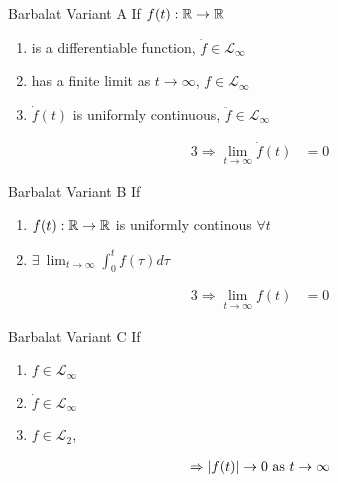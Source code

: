 \begin{lemma}{Barbalat Variant A}
    If $f(t): \mathbb{R} \rightarrow \mathbb{R}$
    \begin{enumerate}
    \item is a differentiable function, $\dot{f} \in \mathcal{L}_\infty$
    \item has a finite limit as $t \rightarrow \infty$, $f \in \mathcal{L}_\infty$ 
    \item $\dot{f}(t)$ is uniformly continuous, $\ddot{f} \in \mathcal{L}_\infty$
    \end{enumerate}
\begin{alignat*}{3}
    \Rightarrow \lim_{t \rightarrow \infty} \dot{f}(t) &= 0
\end{alignat*}
\end{lemma}

\begin{lemma}{Barbalat Variant B}
If
\begin{enumerate}
\item $f(t): \mathbb{R} \rightarrow \mathbb{R}$ is uniformly continous $\forall t$
\item $\exists~ \lim_{t \rightarrow \infty} \int_0^t f(\tau) d\tau$
\end{enumerate}
\begin{alignat*}{3}
\Rightarrow \lim_{t \rightarrow \infty} f(t) &= 0
\end{alignat*}
\end{lemma}

\begin{lemma}{Barbalat Variant C}
If
\begin{enumerate}
\item $f \in \mathcal{L}_\infty$ 
\item $\dot{f} \in \mathcal{L}_\infty $
\item $f \in \mathcal{L}_2$,
\end{enumerate}
\begin{alignat*}{3}
\Rightarrow |f(t)| \rightarrow 0 \textnormal{ as } t \rightarrow \infty
\end{alignat*}
\end{lemma}
